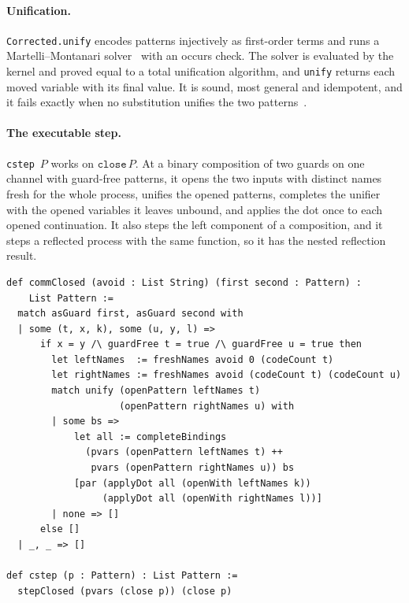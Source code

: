 \documentclass[11pt]{article}
\theoremstyle{definition}
\theoremstyle{remark}
\begin{document}
\paragraph{Unification.}
\texttt{Corrected.unify} encodes patterns injectively as first-order terms
and runs a Martelli--Montanari solver~\cite{MartelliMontanari1982} with an
occurs check.  The solver is evaluated by the kernel and proved equal to a
total unification algorithm, and \texttt{unify} returns each moved
variable with its final value.  It is sound, most general and idempotent,
and it fails exactly when no substitution unifies the two
patterns~\cite{Robinson1965}.

\paragraph{The executable step.}
\texttt{cstep}~$P$ works on $\mathtt{close}\,P$.  At a binary composition
of two guards on one channel with guard-free patterns, it opens the two
inputs with distinct names fresh for the whole process, unifies the opened
patterns, completes the unifier with the opened variables it leaves
unbound, and applies the dot once to each opened continuation.  It also
steps the left component of a composition, and it steps a reflected
process with the same function, so it has the nested reflection result.

\begin{lstlisting}[caption={The corrected COMM (from \texttt{CorrectedReduction.lean})}]
def commClosed (avoid : List String) (first second : Pattern) :
    List Pattern :=
  match asGuard first, asGuard second with
  | some (t, x, k), some (u, y, l) =>
      if x = y /\ guardFree t = true /\ guardFree u = true then
        let leftNames  := freshNames avoid 0 (codeCount t)
        let rightNames := freshNames avoid (codeCount t) (codeCount u)
        match unify (openPattern leftNames t)
                    (openPattern rightNames u) with
        | some bs =>
            let all := completeBindings
              (pvars (openPattern leftNames t) ++
               pvars (openPattern rightNames u)) bs
            [par (applyDot all (openWith leftNames k))
                 (applyDot all (openWith rightNames l))]
        | none => []
      else []
  | _, _ => []

def cstep (p : Pattern) : List Pattern :=
  stepClosed (pvars (close p)) (close p)
\end{lstlisting}
\end{document}
